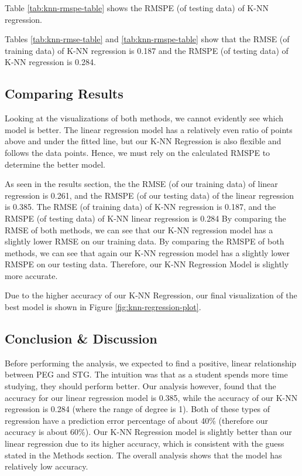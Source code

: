 \documentclass[
]{article}
\begin{document}
Table \ref{tab:knn-rmspe-table} shows the RMSPE (of testing data) of K-NN regression.

Tables \ref{tab:knn-rmse-table} and \ref{tab:knn-rmspe-table} show that the RMSE (of training data) of K-NN regression is 0.187 and the RMSPE (of testing data) of K-NN regression is 0.284.

\hypertarget{comparing-results}{%
\subsection{Comparing Results}\label{comparing-results}}

Looking at the visualizations of both methods, we cannot evidently see which model is better. The linear regression model has a relatively even ratio of points above and under the fitted line, but our K-NN Regression is also flexible and follows the data points. Hence, we must rely on the calculated RMSPE to determine the better model.

As seen in the results section, the the RMSE (of our training data) of linear regression is 0.261, and the RMSPE (of our testing data) of the linear regression is 0.385. The RMSE (of training data) of K-NN regression is 0.187, and the RMSPE (of testing data) of K-NN linear regression is 0.284 By comparing the RMSE of both methods, we can see that our K-NN regression model has a slightly lower RMSE on our training data. By comparing the RMSPE of both methods, we can see that again our K-NN regression model has a slightly lower RMSPE on our testing data. Therefore, our K-NN Regression Model is slightly more accurate.

Due to the higher accuracy of our K-NN Regression, our final visualization of the best model is shown in Figure \ref{fig:knn-regression-plot}.

\hypertarget{conclusion-discussion}{%
\subsection{Conclusion \& Discussion}\label{conclusion-discussion}}

Before performing the analysis, we expected to find a positive, linear relationship between PEG and STG. The intuition was that as a student spends more time studying, they should perform better. Our analysis however, found that the accuracy for our linear regression model is 0.385, while the accuracy of our K-NN regression is 0.284 (where the range of degree is 1). Both of these types of regression have a prediction error percentage of about 40\% (therefore our accuracy is about 60\%). Our K-NN Regression model is slightly better than our linear regression due to its higher accuracy, which is consistent with the guess stated in the Methods section. The overall analysis shows that the model has relatively low accuracy.
\end{document}
